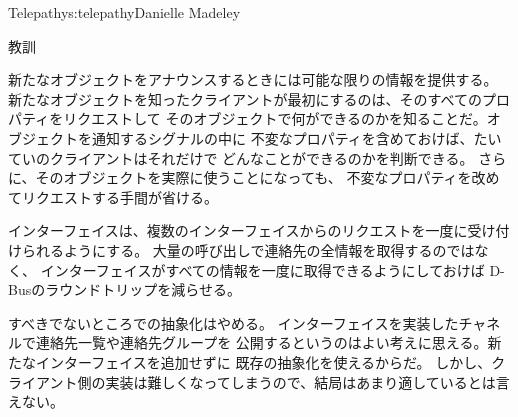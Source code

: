 \begin{aosachapter}{Telepathy}{s:telepathy}{Danielle Madeley}
\begin{aosasect1}{教訓}
\begin{aosadescription}
  \item{新たなオブジェクトをアナウンスするときには可能な限りの情報を提供する。}
  新たなオブジェクトを知ったクライアントが最初にするのは、そのすべてのプロパティをリクエストして
  そのオブジェクトで何ができるのかを知ることだ。オブジェクトを通知するシグナルの中に
  不変なプロパティを含めておけば、たいていのクライアントはそれだけで
  どんなことができるのかを判断できる。
  さらに、そのオブジェクトを実際に使うことになっても、
  不変なプロパティを改めてリクエストする手間が省ける。

  \item{インターフェイスは、複数のインターフェイスからのリクエストを一度に受け付けられるようにする。}
  大量の呼び出しで連絡先の全情報を取得するのではなく、
  インターフェイスがすべての情報を一度に取得できるようにしておけば
  D-Busのラウンドトリップを減らせる。

  \item{すべきでないところでの抽象化はやめる。}
  インターフェイスを実装したチャネルで連絡先一覧や連絡先グループを
  公開するというのはよい考えに思える。新たなインターフェイスを追加せずに
  既存の抽象化を使えるからだ。
  しかし、クライアント側の実装は難しくなってしまうので、結局はあまり適しているとは言えない。


\end{aosadescription}
\end{aosasect1}
\end{aosachapter}
